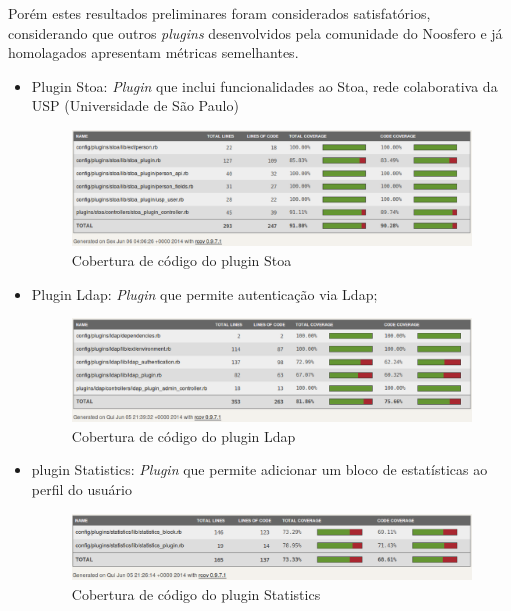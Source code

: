 Porém estes resultados preliminares foram considerados satisfatórios, considerando que outros \textit{plugins} desenvolvidos pela comunidade do Noosfero e já homolagados apresentam métricas semelhantes.
\begin{itemize}
\item Plugin Stoa: \textit{Plugin} que inclui funcionalidades ao Stoa, rede colaborativa da USP (Universidade de São Paulo)

\begin{figure}[!h]
    \centering
    \includegraphics[keepaspectratio=false,scale=0.45]
      {figuras/stoa.eps}
    \caption{Cobertura de código do plugin Stoa}
    \label{consideracoes_cobertura3}
\end{figure}

\item Plugin Ldap: \textit{Plugin} que permite autenticação via Ldap;

\begin{figure}[!h]
    \centering
    \includegraphics[keepaspectratio=false,scale=0.45]
      {figuras/ldap.eps}
    \caption{Cobertura de código do plugin Ldap}
    \label{consideracoes_cobertura4}
\end{figure}

\item plugin Statistics: \textit{Plugin} que permite adicionar um bloco de estatísticas ao perfil do usuário

\begin{figure}[!h]
    \centering
    \includegraphics[keepaspectratio=false,scale=0.45]
      {figuras/statistics.eps}
    \caption{Cobertura de código do plugin Statistics}
    \label{consideracoes_cobertura3}
\end{figure}

\end{itemize}

